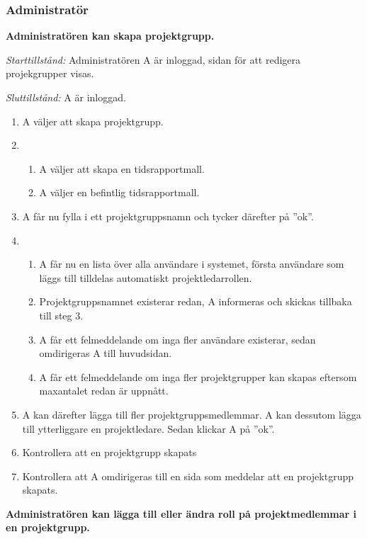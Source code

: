 \documentclass[a4paper]{article}
\begin{document}
\subsubsection{Administratör}

\begin{ST}

\item
\textbf{Administratören kan skapa projektgrupp.}

\emph{Starttillstånd:} Administratören A är inloggad, sidan för att redigera projekgrupper visas.

\emph{Sluttillstånd:} A är inloggad.

\begin{enumerate}
\item A väljer att skapa projektgrupp.
\item
\begin{enumerate}
\item A väljer att skapa en tidsrapportmall.
\item A väljer en befintlig tidsrapportmall.
\end{enumerate}
\item A får nu fylla i ett projektgruppsnamn och tycker därefter på ''ok''.
\item 
\begin{enumerate}
\item A får nu en lista över alla användare i systemet, första användare som läggs till tilldelas automatiskt projektledarrollen.
\item Projektgruppsnamnet existerar redan, A informeras och skickas tillbaka till steg 3.
\item A får ett felmeddelande om inga fler användare existerar, sedan omdirigeras A till huvudsidan.
\item A får ett felmeddelande om inga fler projektgrupper kan skapas eftersom maxantalet redan är uppnått.
\end{enumerate}
\item A kan därefter lägga till fler projektgruppsmedlemmar. A kan dessutom lägga till ytterliggare en projektledare. Sedan klickar A på ''ok''.
\item Kontrollera att en projektgrupp skapats
\item Kontrollera att A omdirigeras till en sida som meddelar att en projektgrupp skapats.
\end{enumerate}

\item
\textbf{Administratören kan lägga till eller ändra roll på projektmedlemmar i en projektgrupp.}


\end{ST}
\end{document}
